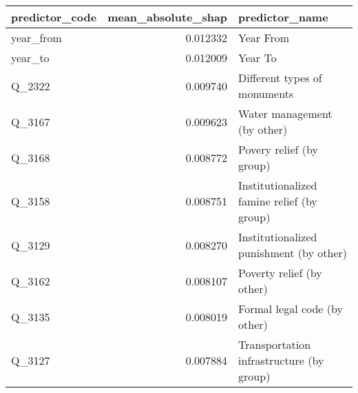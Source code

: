 \begin{tabular}{lrl}
\toprule
predictor_code & mean_absolute_shap & predictor_name \\
\midrule
year_from & 0.012332 & Year From \\
year_to & 0.012009 & Year To \\
Q_2322 & 0.009740 & Different types of monuments \\
Q_3167 & 0.009623 & Water management (by other) \\
Q_3168 & 0.008772 & Povery relief (by group) \\
Q_3158 & 0.008751 & Institutionalized famine relief (by group) \\
Q_3129 & 0.008270 & Institutionalized punishment (by other) \\
Q_3162 & 0.008107 & Poverty relief (by other) \\
Q_3135 & 0.008019 & Formal legal code (by other) \\
Q_3127 & 0.007884 & Transportation infrastructure (by group) \\
\bottomrule
\end{tabular}
